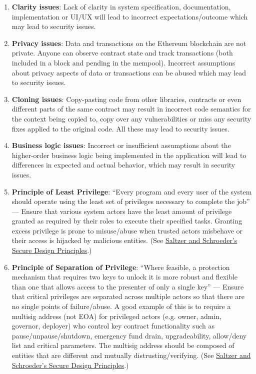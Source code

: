 \begin{enumerate}
\item\textbf{Clarity issues}: Lack of clarity in system specification, documentation, implementation or UI/UX will lead to incorrect expectations/outcome which may lead to security issues.

\item\textbf{Privacy issues}: Data and transactions on the Ethereum blockchain are not private. Anyone can observe contract state and track transactions (both included in a block and pending in the mempool). Incorrect assumptions about privacy aspects of data or transactions can be abused which may lead to security issues.

\item\textbf{Cloning issues}: Copy-pasting code from other libraries, contracts or even different parts of the same contract may result in incorrect code semantics for the context being copied to, copy over any vulnerabilities or miss any security fixes applied to the original code. All these may lead to security issues.

\item\textbf{Business logic issues}: Incorrect or insufficient assumptions about the higher-order business logic being implemented in the application will lead to differences in expected and actual behavior, which may result in security issues.

\item\textbf{Principle of Least Privilege}: “Every program and every user of the system should operate using the least set of privileges necessary to complete the job” — Ensure that various system actors have the least amount of privilege granted as required by their roles to execute their specified tasks. Granting excess privilege is prone to misuse/abuse when trusted actors misbehave or their access is hijacked by malicious entities. (See \href{https://en.wikipedia.org/wiki/Saltzer\_and\_Schroeder's\_design\_principles}{Saltzer and Schroeder's Secure Design Principles}.)

\item\textbf{Principle of Separation of Privilege}: “Where feasible, a protection mechanism that requires two keys to unlock it is more robust and flexible than one that allows access to the presenter of only a single key” — Ensure that critical privileges are separated across multiple actors so that there are no single points of failure/abuse. A good example of this is to require a multisig address (not EOA) for privileged actors (e.g. owner, admin, governor, deployer) who control key contract functionality such as pause/unpause/shutdown, emergency fund drain, upgradeability, allow/deny list and critical parameters. The multisig address should be composed of entities that are different and mutually distrusting/verifying. (See \href{https://en.wikipedia.org/wiki/Saltzer\_and\_Schroeder's\_design\_principles}{Saltzer and Schroeder's Secure Design Principles}.)


\end{enumerate}
